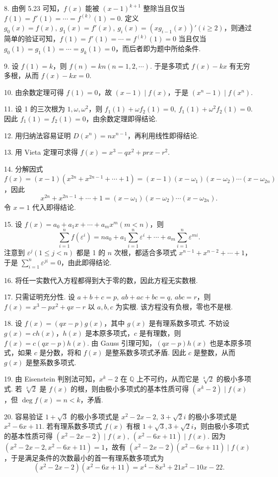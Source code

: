\documentclass[UTF8, 12pt, fontset=fandol, oneside]{ctexart}
\begin{document}
8. 由例 5.23 可知，$f(x)$ 能被 $(x-1)^{k+1}$ 整除当且仅当 $f(1)=f'(1)=\cdots=f^{(k)}(1)=0$. 定义 $g_0(x)=f(x),\ g_1(x)=f'(x),\ g_i(x)=(xg_{i-1}(x))'(i\ge2)$，则通过简单的验证可知，$f(1)=f'(1)=\cdots=f^{(k)}(1)=0$ 当且仅当 $g_0(1)=g_1(1)=\cdots=g_k(1)=0$，而后者即为题中所给条件.

9. 设 $f(1)=k$，则 $f(n)=kn(n=1,2,\cdots)$. 于是多项式 $f(x)-kx$ 有无穷多根，从而 $f(x)-kx=0$.

10. 由余数定理可得 $f(1)=0$，故 $(x-1)\mid f(x)$，于是 $(x^n-1)\mid f(x^n)$.

11. 设 1 的三次根为 $1,\omega,\omega^2$，则 $f_1(1)+\omega f_2(1)=0,\ f_1(1)+\omega^2f_2(1)=0$. 因此 $f_1(1)=f_2(1)=0$，由余数定理即得结论.

12. 用归纳法容易证明 $D(x^n)=nx^{n-1}$，再利用线性即得结论.

13. 用 Vieta 定理可求得 $f(x)=x^3-qx^2+prx-r^2$.

14. 分解因式 $f(x)=(x-1)(x^{2n}+x^{2n-1}+\cdots+1)=(x-1)(x-\omega_1)(x-\omega_2)\cdots(x-\omega_{2n})$，因此
\[
x^{2n}+x^{2n-1}+\cdots+1=(x-\omega_1)(x-\omega_2)\cdots(x-\omega_{2n}).
\]
令 $x=1$ 代入即得结论.

15. 设 $f(x)=a_0+a_1x+\cdots+a_mx^m(m<n)$，则
\[
\sum_{i=1}^n f(\varepsilon^i)=na_0+a_1\sum_{i=1}^n\varepsilon^i+\cdots+a_m\sum_{i=1}^n\varepsilon^{mi}.
\]
注意到 $\varepsilon^j(1\le j<n)$ 都是 1 的 $n$ 次根，都适合多项式 $x^{n-1}+x^{n-2}+\cdots+1$，于是 $\sum_{i=1}^n\varepsilon^{ji}=0$，由此即得结论.

16. 将任一实数代入方程都得到大于零的数，因此方程无实数根.

17. 只需证明充分性. 设 $a+b+c=p,\ ab+ac+bc=q,\ abc=r$，则 $f(x)=x^3-px^2+qx-r$ 以 $a,b,c$ 为实根. 该方程没有负根，零也不是根.

18. 设 $f(x)=(qx-p)g(x)$，其中 $g(x)$ 是有理系数多项式. 不妨设 $g(x)=ch(x)$，$h(x)$ 是本原多项式，$c$ 是有理数，则 $f(x)=c(qx-p)h(x)$. 由 Gauss 引理可知，$(qx-p)h(x)$ 也是本原多项式，如果 $c$ 是分数，将和 $f(x)$ 是整系数多项式矛盾. 因此 $c$ 是整数，从而 $g(x)$ 是整系数多项式.

19. 由 Eisenstein 判别法可知，$x^k-2$ 在 $\mathbb{Q}$ 上不可约，从而它是 $\sqrt[k]{2}$ 的极小多项式. 若 $\sqrt[k]{2}$ 是 $f(x)$ 的根，则由极小多项式的基本性质可得 $(x^k-2)\mid f(x)$，但 $\deg f(x)=n<k$，矛盾.

20. 容易验证 $1+\sqrt{3}$ 的极小多项式是 $x^2-2x-2,\ 3+\sqrt{2}i$ 的极小多项式是 $x^2-6x+11$. 若有理系数多项式 $f(x)$ 有根 $1+\sqrt{3},3+\sqrt{2}i$，则由极小多项式的基本性质可得 $(x^2-2x-2)\mid f(x),\ (x^2-6x+11)\mid f(x)$. 因为 $(x^2-2x-2,x^2-6x+11)=1$，故有 $(x^2-2x-2)(x^2-6x+11)\mid f(x)$，于是满足条件的次数最小的首一有理系数多项式为
\[
(x^2-2x-2)(x^2-6x+11)=x^4-8x^3+21x^2-10x-22.
\]
\end{document}
